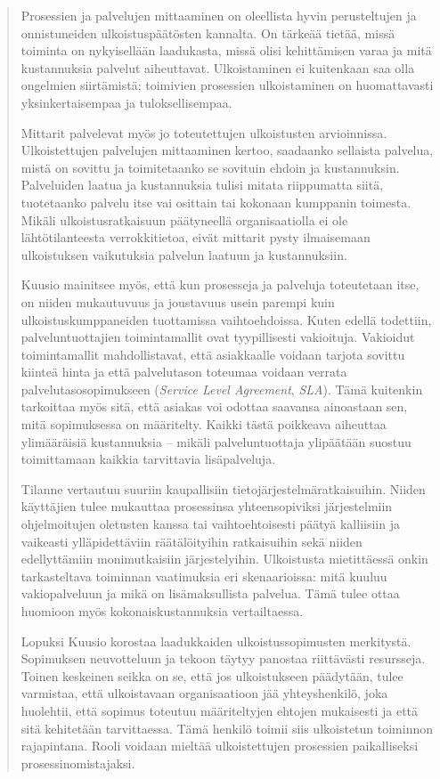 \documentclass[
  finnish,
  letterpaper,
  DIV=11,
  numbers=noendperiod,
  oneside]{scrreprt}
\begin{document}
\begin{quote}
Prosessien ja palvelujen mittaaminen on oleellista hyvin perusteltujen
ja onnistuneiden ulkoistuspäätösten kannalta. On tärkeää tietää, missä
toiminta on nykyisellään laadukasta, missä olisi kehittämisen varaa ja
mitä kustannuksia palvelut aiheuttavat. Ulkoistaminen ei kuitenkaan saa
olla ongelmien siirtämistä; toimivien prosessien ulkoistaminen on
huomattavasti yksinkertaisempaa ja tuloksellisempaa.

Mittarit palvelevat myös jo toteutettujen ulkoistusten arvioinnissa.
Ulkoistettujen palvelujen mittaaminen kertoo, saadaanko sellaista
palvelua, mistä on sovittu ja toimitetaanko se sovituin ehdoin ja
kustannuksin. Palveluiden laatua ja kustannuksia tulisi mitata
riippumatta siitä, tuotetaanko palvelu itse vai osittain tai kokonaan
kumppanin toimesta. Mikäli ulkoistusratkaisuun päätyneellä
organisaatiolla ei ole lähtötilanteesta verrokkitietoa, eivät mittarit
pysty ilmaisemaan ulkoistuksen vaikutuksia palvelun laatuun ja
kustannuksiin.

Kuusio mainitsee myös, että kun prosesseja ja palveluja toteutetaan
itse, on niiden mukautuvuus ja joustavuus usein parempi kuin
ulkoistuskumppaneiden tuottamissa vaihtoehdoissa. Kuten edellä
todettiin, palveluntuottajien toimintamallit ovat tyypillisesti
vakioituja. Vakioidut toimintamallit mahdollistavat, että asiakkaalle
voidaan tarjota sovittu kiinteä hinta ja että palvelutason toteumaa
voidaan verrata palvelutasosopimukseen (\emph{Service Level Agreement},
\emph{SLA}). Tämä kuitenkin tarkoittaa myös sitä, että asiakas voi
odottaa saavansa ainoastaan sen, mitä sopimuksessa on määritelty. Kaikki
tästä poikkeava aiheuttaa ylimääräisiä kustannuksia -- mikäli
palveluntuottaja ylipäätään suostuu toimittamaan kaikkia tarvittavia
lisäpalveluja.

Tilanne vertautuu suuriin kaupallisiin tietojärjestelmäratkaisuihin.
Niiden käyttäjien tulee mukauttaa prosessinsa yhteensopiviksi
järjestelmiin ohjelmoitujen oletusten kanssa tai vaihtoehtoisesti päätyä
kalliisiin ja vaikeasti ylläpidettäviin räätälöityihin ratkaisuihin sekä
niiden edellyttämiin monimutkaisiin järjestelyihin. Ulkoistusta
mietittäessä onkin tarkasteltava toiminnan vaatimuksia eri
skenaarioissa: mitä kuuluu vakiopalveluun ja mikä on lisämaksullista
palvelua. Tämä tulee ottaa huomioon myös kokonaiskustannuksia
vertailtaessa.

Lopuksi Kuusio korostaa laadukkaiden ulkoistussopimusten merkitystä.
Sopimuksen neuvotteluun ja tekoon täytyy panostaa riittävästi
resursseja. Toinen keskeinen seikka on se, että jos ulkoistukseen
päädytään, tulee varmistaa, että ulkoistavaan organisaatioon jää
yhteyshenkilö, joka huolehtii, että sopimus toteutuu määriteltyjen
ehtojen mukaisesti ja että sitä kehitetään tarvittaessa. Tämä henkilö
toimii siis ulkoistetun toiminnon rajapintana. Rooli voidaan mieltää
ulkoistettujen prosessien paikalliseksi prosessinomistajaksi.


\end{quote}
\end{document}

